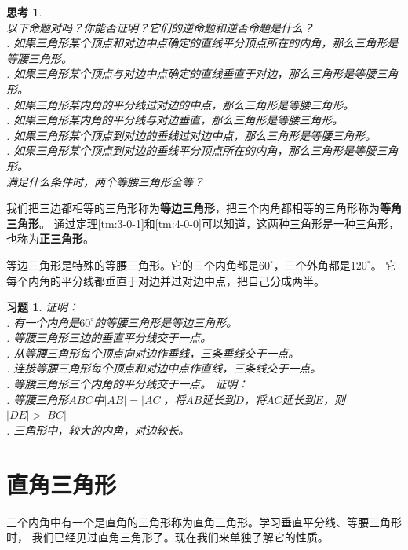 \documentclass[12pt,UTF8]{ctexbook}
\newtheorem{sk}{思考}[section]
\newtheorem{xt}{习题}[section]
\begin{document}
\begin{sk}\label{sk:4-0-0}
    \mbox{}\\
    以下命题对吗？你能否证明？它们的逆命题和逆否命題是什么？\\
    . 如果三角形某个顶点和对边中点确定的直线平分顶点所在的内角，那么三角形是等腰三角形。\\
    . 如果三角形某个顶点与对边中点确定的直线垂直于对边，那么三角形是等腰三角形。\\
    . 如果三角形某内角的平分线过对边的中点，那么三角形是等腰三角形。\\
    . 如果三角形某内角的平分线与对边垂直，那么三角形是等腰三角形。\\
    . 如果三角形某个顶点到对边的垂线过对边中点，那么三角形是等腰三角形。\\
    . 如果三角形某个顶点到对边的垂线平分顶点所在的内角，那么三角形是等腰三角形。\\
    满足什么条件时，两个等腰三角形全等？\\
\end{sk}

我们把三边都相等的三角形称为\textbf{等边三角形}，把三个内角都相等的三角形称为\textbf{等角三角形}。
通过定理\ref{tm:3-0-1}和\ref{tm:4-0-0}可以知道，这两种三角形是一种三角形，也称为\textbf{正三角形}。

等边三角形是特殊的等腰三角形。它的三个内角都是$60^\circ$，三个外角都是$120^\circ$。
它每个内角的平分线都垂直于对边并过对边中点，把自己分成两半。

\begin{xt}\label{xt:4-0-0}
    证明：\\
    . 有一个内角是$60^\circ$的等腰三角形是等边三角形。\\
    . 等腰三角形三边的垂直平分线交于一点。\\
    . 从等腰三角形每个顶点向对边作垂线，三条垂线交于一点。\\
    . 连接等腰三角形每个顶点和对边中点作直线，三条线交于一点。\\
    . 等腰三角形三个内角的平分线交于一点。
    证明： \\
    . 等腰三角形$ABC$中$|AB| = |AC|$，将$AB$延长到$D$，将$AC$延长到$E$，则$|DE| > |BC|$\\
    . 三角形中，较大的内角，对边较长。
\end{xt}

\section{直角三角形}
三个内角中有一个是直角的三角形称为直角三角形。学习垂直平分线、等腰三角形时，
我们已经见过直角三角形了。现在我们来单独了解它的性质。
\end{document}
